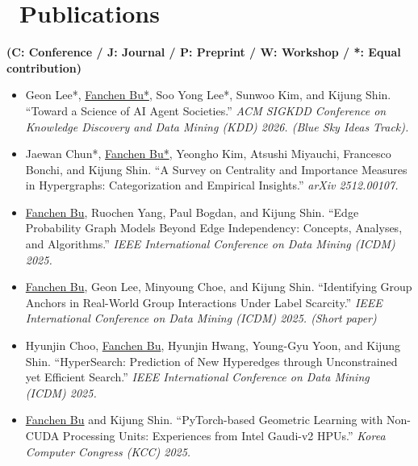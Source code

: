 \documentclass{resume}
\begin{document}

\section{\faBook\ Publications}
\textbf{(C: Conference / J: Journal / P: Preprint / W: Workshop / *: Equal contribution)}
\begin{itemize}[parsep=0.5ex]
  \item [{[C21]}]
  Geon Lee*, \underline{Fanchen Bu*}, Soo Yong Lee*, Sunwoo Kim, and Kijung Shin.
  ``Toward a Science of AI Agent Societies.''
  \textit{ACM SIGKDD Conference on Knowledge Discovery and Data Mining (KDD) 2026. (Blue Sky Ideas Track).}

  \item [{[P1]}]
  Jaewan Chun*, \underline{Fanchen Bu*}, Yeongho Kim, Atsushi Miyauchi, Francesco Bonchi, and Kijung Shin.
  ``A Survey on Centrality and Importance Measures in Hypergraphs: Categorization and Empirical Insights.''
  \textit{arXiv 2512.00107.}

  \item [{[C20]}]
  \underline{Fanchen Bu}, Ruochen Yang, Paul Bogdan, and Kijung Shin.
  ``Edge Probability Graph Models Beyond Edge Independency: Concepts, Analyses, and Algorithms.''
  \textit{IEEE International Conference on Data Mining (ICDM) 2025.}

  \item [{[C19]}]
  \underline{Fanchen Bu}, Geon Lee, Minyoung Choe, and Kijung Shin.
  ``Identifying Group Anchors in Real-World Group Interactions Under Label Scarcity.''
  \textit{IEEE International Conference on Data Mining (ICDM) 2025. (Short paper)}

  \item [{[C18]}]
  Hyunjin Choo, \underline{Fanchen Bu}, Hyunjin Hwang, Young-Gyu Yoon, and Kijung Shin.
  ``HyperSearch: Prediction of New Hyperedges through Unconstrained yet Efficient Search.''
  \textit{IEEE International Conference on Data Mining (ICDM) 2025.}
  
  \item [{[C17]}]
  \underline{Fanchen Bu} and Kijung Shin.
  ``PyTorch-based Geometric Learning with Non-CUDA Processing Units: Experiences from Intel Gaudi-v2 HPUs.''
  \textit{Korea Computer Congress (KCC) 2025.}
  

\end{itemize}
\end{document}
